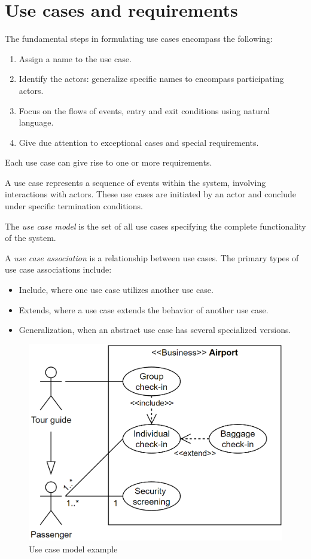 \section{Use cases and requirements}

The fundamental steps in formulating use cases encompass the following:
\begin{enumerate}
    \item Assign a name to the use case.
    \item Identify the actors: generalize specific names to encompass participating actors.
    \item Focus on the flows of events, entry and exit conditions using natural language.
    \item Give due attention to exceptional cases and special requirements.
\end{enumerate}
Each use case can give rise to one or more requirements.
 
A use case represents a sequence of events within the system, involving interactions with actors. 
These use cases are initiated by an actor and conclude under specific termination conditions.
\begin{definition}
    The \emph{use case model} is the set of all use cases specifying the complete functionality of the system. 

    A \emph{use case association} is a relationship between use cases. 
    The primary types of use case associations include:
    \begin{itemize}
        \item Include, where one use case utilizes another use case.
        \item Extends, where a use case extends the behavior of another use case.
        \item Generalization, when an abstract use case has several specialized versions.
    \end{itemize}
\end{definition}
\begin{figure}[H]
    \centering
    \includegraphics[width=0.5\linewidth]{images/usecase.png}
    \caption{Use case model example}
\end{figure}